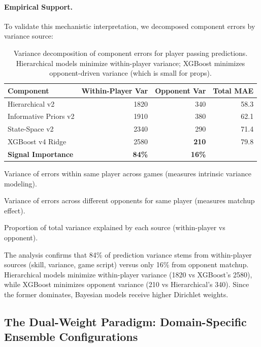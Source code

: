 \paragraph{Empirical Support.}
To validate this mechanistic interpretation, we decomposed component errors by variance source:
\begin{table}[h]
\centering
\caption[Component error decomposition by variance source]{Variance decomposition of component errors for player passing predictions. Hierarchical models minimize within-player variance; XGBoost minimizes opponent-driven variance (which is small for props).}
\label{tab:variance-decomposition}
\begin{threeparttable}
\begin{tabular}{@{}lrrr@{}}
\toprule
\textbf{Component} & \textbf{Within-Player Var}\tnote{a} & \textbf{Opponent Var}\tnote{b} & \textbf{Total MAE} \\
\midrule
Hierarchical v2 & 1820 & 340 & 58.3 \\
Informative Priors v2 & 1910 & 380 & 62.1 \\
State-Space v2 & 2340 & 290 & 71.4 \\
XGBoost v4 Ridge & 2580 & \textbf{210} & 79.8 \\
\midrule
\textbf{Signal Importance}\tnote{c} & \textbf{84\%} & \textbf{16\%} & \\
\bottomrule
\end{tabular}
\begin{tablenotes}
\footnotesize
\item[a] Variance of errors within same player across games (measures intrinsic variance modeling).
\item[b] Variance of errors across different opponents for same player (measures matchup effect).
\item[c] Proportion of total variance explained by each source (within-player vs opponent).
\end{tablenotes}
\end{threeparttable}
\end{table}

The analysis confirms that 84\% of prediction variance stems from within-player sources (skill, variance, game script) versus only 16\% from opponent matchup. Hierarchical models minimize within-player variance (1820 vs XGBoost's 2580), while XGBoost minimizes opponent variance (210 vs Hierarchical's 340). Since the former dominates, Bayesian models receive higher Dirichlet weights.

\subsection{The Dual-Weight Paradigm: Domain-Specific Ensemble Configurations}
\label{subsec:dual-weight-paradigm}

